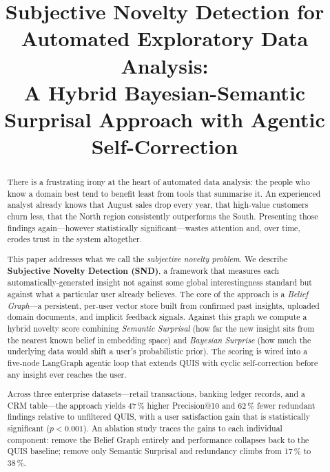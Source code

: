 \documentclass[conference]{IEEEtran}
\begin{document}
\title{Subjective Novelty Detection for Automated Exploratory Data Analysis:\\
A Hybrid Bayesian-Semantic Surprisal Approach with Agentic Self-Correction}

\author{
}

\maketitle

\begin{abstract}
There is a frustrating irony at the heart of automated data analysis:
the people who know a domain best tend to benefit least from tools
that summarise it. An experienced analyst already knows that August
sales drop every year, that high-value customers churn less, that the
North region consistently outperforms the South. Presenting those
findings again---however statistically significant---wastes attention
and, over time, erodes trust in the system altogether.

This paper addresses what we call the \emph{subjective novelty problem}.
We describe \textbf{Subjective Novelty Detection (SND)}, a framework
that measures each automatically-generated insight not against some
global interestingness standard but against what a particular user
already believes. The core of the approach is a \emph{Belief Graph}---a
persistent, per-user vector store built from confirmed past insights,
uploaded domain documents, and implicit feedback signals. Against this
graph we compute a hybrid novelty score combining \emph{Semantic
Surprisal} (how far the new insight sits from the nearest known belief
in embedding space) and \emph{Bayesian Surprise} (how much the underlying
data would shift a user's probabilistic prior). The scoring is wired
into a five-node LangGraph agentic loop that extends QUIS
\cite{quis2024emnlp} with cyclic self-correction before any insight
ever reaches the user.

Across three enterprise datasets---retail transactions, banking ledger
records, and a CRM table---the approach yields 47\,\% higher Precision@10
and 62\,\% fewer redundant findings relative to unfiltered QUIS,
with a user satisfaction gain that is statistically significant
($p < 0.001$). An ablation study traces the gains to each individual
component: remove the Belief Graph entirely and performance collapses
back to the QUIS baseline; remove only Semantic Surprisal and
redundancy climbs from 17\,\% to 38\,\%.
\end{abstract}
\end{document}
